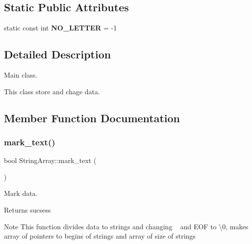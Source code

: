 \subsection*{Static Public Attributes}
\begin{DoxyCompactItemize}
\item 
\mbox{\label{class_string_array_a289374a524ce95d470918c9978cb90c1}} 
static const int {\bfseries N\+O\+\_\+\+L\+E\+T\+T\+ER} = -\/1
\end{DoxyCompactItemize}


\subsection{Detailed Description}
Main class. 

This class store and chage data. 

\subsection{Member Function Documentation}
\mbox{\label{class_string_array_acf2d98a2d86af02293de4bbe186b9f07}} 
\subsubsection{\texorpdfstring{mark\+\_\+text()}{mark\_text()}}
{\footnotesize\ttfamily bool String\+Array\+::mark\+\_\+text (\begin{DoxyParamCaption}{ }\end{DoxyParamCaption})}



Mark data. 

\begin{DoxyReturn}{Returns}
sucsess
\end{DoxyReturn}
\begin{DoxyNote}{Note}
This function divides data to strings and changing \textquotesingle{}~\newline
\textquotesingle{} and E\+OF to \textquotesingle{}\textbackslash{}0\textquotesingle{}, makes array of pointers to begins of strings and array of size of strings 
\end{DoxyNote}
\mbox{\label{class_string_array_a4b24347f36da4c591463d39ddbce1660}} 

